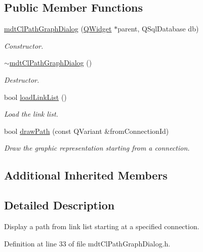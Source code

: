 \subsection*{Public Member Functions}
\begin{DoxyCompactItemize}
\item 
\hyperlink{classmdt_cl_path_graph_dialog_afcc2054a4da9c47c1ffc6de248e8a410}{mdt\-Cl\-Path\-Graph\-Dialog} (\hyperlink{class_q_widget}{Q\-Widget} $\ast$parent, Q\-Sql\-Database db)
\begin{DoxyCompactList}\small\item\em Constructor. \end{DoxyCompactList}\item 
\hyperlink{classmdt_cl_path_graph_dialog_a2bce7d330797ffa3d2deaa3725a72d5a}{$\sim$mdt\-Cl\-Path\-Graph\-Dialog} ()
\begin{DoxyCompactList}\small\item\em Destructor. \end{DoxyCompactList}\item 
bool \hyperlink{classmdt_cl_path_graph_dialog_a241b794bd923c18a358c675e1dbbf8bf}{load\-Link\-List} ()
\begin{DoxyCompactList}\small\item\em Load the link list. \end{DoxyCompactList}\item 
bool \hyperlink{classmdt_cl_path_graph_dialog_a0a4600a04a033c0daccac04baa626c02}{draw\-Path} (const Q\-Variant \&from\-Connection\-Id)
\begin{DoxyCompactList}\small\item\em Draw the graphic representation starting from a connection. \end{DoxyCompactList}\end{DoxyCompactItemize}
\subsection*{Additional Inherited Members}


\subsection{Detailed Description}
Display a path from link list starting at a specified connection. 

Definition at line 33 of file mdt\-Cl\-Path\-Graph\-Dialog.\-h.



